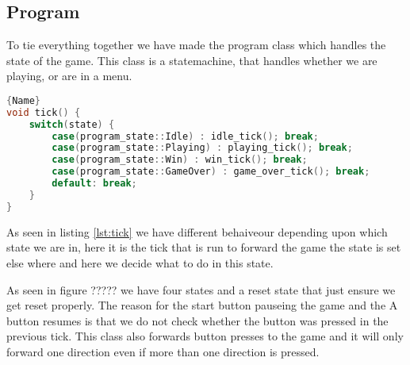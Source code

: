 \subsection{Program}
To tie everything together we have made the program class which handles the state of the game.
This class is a statemachine, that handles whether we are playing, or are in a menu. 

\begin{lstlisting}[caption={A tick of the game},label={lst:tick},frame=tlrb, language=C++]{Name}
void tick() {
	switch(state) {
		case(program_state::Idle) : idle_tick(); break;
		case(program_state::Playing) : playing_tick(); break;
		case(program_state::Win) : win_tick(); break;
		case(program_state::GameOver) : game_over_tick(); break;
		default: break;
	}
}
\end{lstlisting}

As seen in listing \ref{lst:tick} we have different behaiveour depending upon which state we are in, 
here it is the tick that is run to forward the game the state is set else where and here we decide what to do in this state.



As seen in figure ????? we have four states and a reset state that just ensure we get reset properly.
The reason for the start button pauseing the game and the A button resumes is that we do not check whether the button was pressed in the previous tick.
This class also forwards button presses to the game and it will only forward one direction even if more than one direction is pressed.
